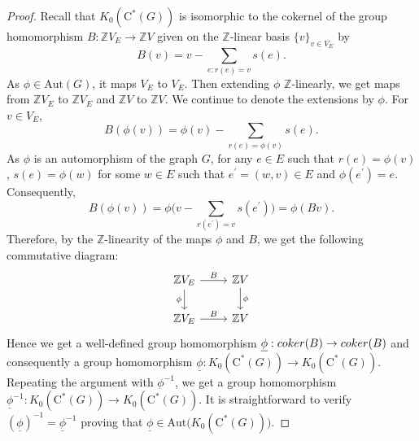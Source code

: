 \documentclass[10pt,a4paper]{amsart}
\begin{document}
            \begin{proof}
            Recall that $K_{0}(\textrm{C}^{\ast}(G))$ is isomorphic to the cokernel of the group homomorphism $B:\mathbb{Z}V_{E}\rightarrow\mathbb{Z}V$ given on the $\mathbb{Z}$-linear basis $\{v\}_{v\in V_{E}}$ by
            \begin{displaymath}
                B(v)=v-\sum_{e:r(e)=v}s(e).
            \end{displaymath}
            As $\phi\in\textrm {Aut}(G)$, it maps $V_{E}$ to $V_{E}$. Then extending $\phi$ $\mathbb{Z}$-linearly, we get maps from $\mathbb{Z}V_{E}$ to $\mathbb{Z}V_{E}$ and $\mathbb{Z}V$ to $\mathbb{Z}V$. We continue to denote the extensions by $\phi$. For $v\in V_{E}$,
            \begin{displaymath}
                B(\phi(v))=\phi(v)-\sum_{r(e)=\phi(v)}s(e).
            \end{displaymath}
            As $\phi$ is an automorphism of the graph $G$, for any $e\in E$ such that $r(e)=\phi(v)$, $s(e)=\phi(w)$ for some $w\in E$ such that $e^{\prime}=(w,v)\in E$ and  $\phi(e^{\prime})=e$. Consequently, 
            \begin{displaymath}
                B(\phi(v))=\phi\Big(v-\sum_{r(e^{\prime})=v}s(e^{\prime})\Big)=\phi(Bv).
            \end{displaymath}
            Therefore, by the $\mathbb{Z}$-linearity of the maps $\phi$ and $B$, we get the following commutative diagram:
            \[
\begin{tikzcd}
\mathbb{Z}V_{E} \arrow{r}{B} \arrow[swap]{d}{\phi} & \mathbb{Z}V \arrow{d}{\phi} \\
\mathbb{Z}V_{E} \arrow{r}{B} & \mathbb{Z}V
\end{tikzcd}
\]
Hence we get a well-defined group homomorphism $\underline{\phi}:{\rm coker}(B)\rightarrow {\rm coker}(B)$ and consequently a group homomorphism $\underline{\phi}:K_{0}(\textrm{C}^{\ast}(G))\rightarrow K_{0}(\textrm{C}^{\ast}(G))$. Repeating the argument with $\phi^{-1}$, we get a group homomorphism $\underline{\phi}^{-1}:K_{0}(\textrm{C}^{\ast}(G))\rightarrow K_{0}(\textrm{C}^{\ast}(G))$. It is straightforward to verify $(\underline{\phi})^{-1}=\underline{\phi}^{-1}$ proving that $\underline{\phi}\in\textrm {Aut}\Big(K_{0}(\textrm{C}^{\ast}(G))\Big)$.
            \end{proof}
\end{document}
